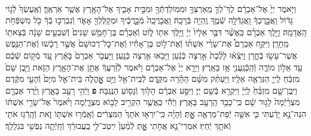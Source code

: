 \documentclass[twoside, openany, parskip=half, 11pt]{book}
\begin{document}
\begin{footnotesize}
\begin{multicols}{2}
\\
וַיֹּ֤אמֶר יְיָ֙ אֶל־אַבְרָ֔ם לֶךְ־לְךָ֛ מֵֽאַרְצְךָ֥ וּמִמּֽוֹלַדְתְּֿךָ֖ וּמִבֵּ֣ית אָבִ֑יךָ אֶל־הָאָ֖רֶץ אֲשֶׁ֥ר אַרְאֶֽךָּ׃ וְֿאֶֽעֶשְׂךָ֙ לְֿג֣וֹי גָּד֔וֹל וַֽאֲבָ֣רֶכְךָ֔ וַֽאֲגַדְּֿלָ֖ה שְֿׁמֶ֑ךָ וֶֽהְיֵ֖ה בְּֿרָכָֽה׃ וַֽאֲבָרֲכָֽה֙ מְֿבָ֣רֲכֶ֔יךָ וּמְקַלֶּלְךָ֖ אָאֹ֑ר וְֿנִבְרְכ֣וּ בְֿךָ֔ כֹּ֖ל מִשְׁפְּֿחֹ֥ת הָֽאֲדָמָֽה׃  וַיֵּ֣לֶךְ אַבְרָ֗ם כַּֽאֲשֶׁ֨ר דִּבֶּ֤ר אֵלָיו֙ יְיָ֔ וַיֵּ֥לֶךְ אִתּ֖וֹ ל֑וֹט וְֿאַבְרָ֗ם בֶּן־חָמֵ֤שׁ שָׁנִים֙ וְֿשִׁבְעִ֣ים שָׁנָ֔ה בְּֿצֵאת֖וֹ מֵֽחָרָֽן׃ וַיִּקַּ֣ח אַבְרָם֩ אֶת־שָׂרַ֨י אִשְׁתּ֜וֹ וְֿאֶת־ל֣וֹט בֶּן־אָחִ֗יו וְֿאֶת־כׇּל־רְכוּשָׁם֙ אֲשֶׁ֣ר רָכָ֔שׁוּ וְֿאֶת־הַנֶּ֖פֶשׁ אֲשֶׁר־עָשׂ֣וּ בְֿחָ֑רָן וַיֵּֽצְֿא֗וּ לָלֶ֨כֶת֙ אַ֣רְצָה כְּֿנַ֔עַן וַיָּבֹ֖אוּ אַ֥רְצָה כְּֿנָֽעַן׃ וַיַּעֲבֹ֤ר אַבְרָם֙ בָּאָ֔רֶץ עַ֚ד מְֿק֣וֹם שְֿׁכֶ֔ם עַ֖ד אֵל֣וֹן מוֹרֶ֑ה וְֿהַֽכְּֿנַֽעֲנִ֖י אָ֥ז בָּאָֽרֶץ׃ וַיֵּרָ֤א יְיָ֙ אֶל־אַבְרָ֔ם וַיֹּ֕אמֶר לְֿזַ֨רְעֲךָ֔ אֶתֵּ֖ן אֶת־הָאָ֣רֶץ הַזֹּ֑את וַיִּ֤בֶן שָׁם֙ מִזְבֵּ֔חַ לַֽייָ֖ הַנִּרְאֶ֥ה אֵלָֽיו׃ וַיַּעְתֵּ֨ק מִשָּׁ֜ם הָהָ֗רָה מִקֶּ֛דֶם לְֿבֵית־אֵ֖ל וַיֵּ֣ט אׇׇׇׇׇׇָֽהֳלֹ֑ה בֵּית־אֵ֤ל מִיָּם֙ וְֿהָעַ֣י מִקֶּ֔דֶם וַיִּֽבֶן־שָׁ֤ם מִזְבֵּ֨חַ֙ לַֽיְיָ֔ וַיִּקְרָ֖א בְּֿשֵׁ֥ם יְיָ׃ וַיִּסַּ֣ע אַבְרָ֔ם הָל֥וֹךְ וְֿנָס֖וֹעַ הַנֶּֽגְבָּה׃ \textbf{פ}
 וַיְֿהִ֥י רָעָ֖ב בָּאָ֑רֶץ וַיֵּ֨רֶד אַבְרָ֤ם מִצְרַ֨יְֿמָה֙ לָג֣וּר שָׁ֔ם כִּֽי־כָבֵ֥ד הָֽרָעָ֖ב בָּאָֽרֶץ׃ וַיְֿהִ֕י כַּֽאֲשֶׁ֥ר הִקְרִ֖יב לָב֣וֹא מִצְרָ֑יְֿמָה וַיֹּ֨אמֶר֙ אֶל־שָׂרַ֣י אִשְׁתּ֔וֹ הִנֵּה־נָ֣א יָדַ֔עְתִּי כִּ֛י אִשָּׁ֥ה יְֿפַת־מַרְאֶ֖ה אׇׇׇָֽתְּ׃ וְֿהָיָ֗ה כִּֽי־יִרְא֤וּ אֹתָךְ֙ הַמִּצְרִ֔ים וְֿאָֽמְֿר֖וּ אִשְׁתּ֣וֹ זֹ֑את וְֿהָֽרְֿג֥וּ אֹתִ֖י וְֿאֹתָ֥ךְ יְֿחַיּֽוּ׃ אִמְרִי־נָ֖א אֲחֹ֣תִי אׇׇָ֑תְּ לְֿמַ֨עַן֙ יִֽיטַב־לִ֣י בַֽעֲבוּרֵ֔ךְ וְֿחָֽיְֿתָ֥ה נַפְשִׁ֖י בִּגְלָלֵֽךְ׃


\end{multicols}
\end{footnotesize}
\end{document}
